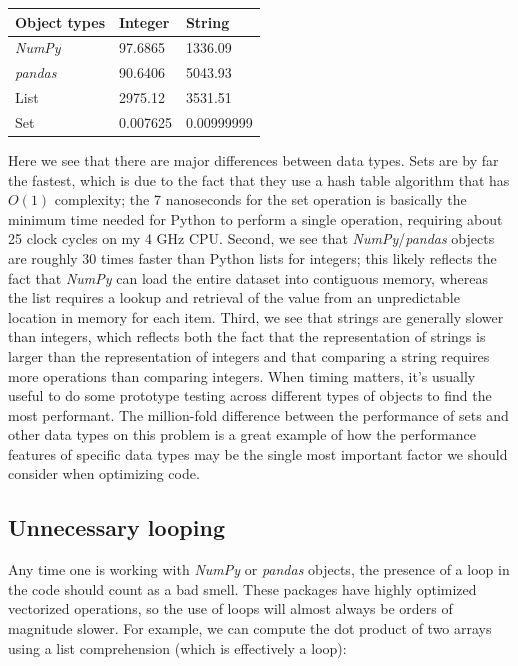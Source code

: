 \bigskip\noindent
\begin{tabular}{p{}p{}p{}}
\toprule
Object types & Integer & String \\
\hline
\textit{NumPy} & 97.6865 & 1336.09 \\
\textit{pandas} & 90.6406 & 5043.93 \\
List & 2975.12 & 3531.51 \\
Set & 0.007625 & 0.00999999 \\
\bottomrule
\end{tabular}

\bigskip

Here we see that there are major differences between data types.  Sets are by far the fastest, which is due to the fact that they use a hash table algorithm that has $O(1)$ complexity; the 7 nanoseconds for the set operation is basically the minimum time needed for Python to perform a single operation, requiring about 25 clock cycles on my 4 GHz CPU. Second, we see that \textit{NumPy}/\textit{pandas} objects are roughly 30 times faster than Python lists for integers; this likely reflects the fact that \textit{NumPy} can load the entire dataset into contiguous memory, whereas the list requires a lookup and retrieval of the value from an unpredictable location in memory for each item.  Third, we see that strings are generally slower than integers, which reflects both the fact that the representation of strings is larger than the representation of integers and that comparing a string requires more operations than comparing integers. When timing matters, it's usually useful to do some prototype testing across different types of objects to find the most performant.  The million-fold difference between the performance of sets and other data types on this problem is a great example of how the performance features of specific data types may be the single most important factor we should consider when optimizing code.

\subsection{Unnecessary looping}

Any time one is working with \textit{NumPy} or \textit{pandas} objects, the presence of a loop in the code should count as a bad smell.  These packages have highly optimized vectorized operations, so the use of loops will almost always be orders of magnitude slower.  For example, we can compute the dot product of two arrays using a list comprehension (which is effectively a loop):

